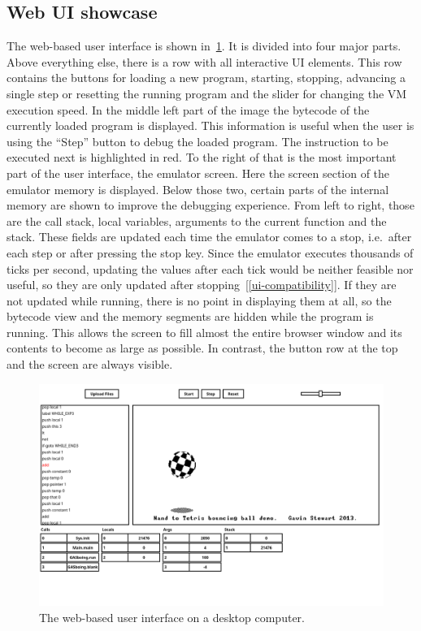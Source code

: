 \subsection{Web UI showcase} \label{ui-showcase}
The web-based user interface is shown in~\cref{fig:ui-demo-desktop}.
It is divided into four major parts.
Above everything else, there is a row with all interactive UI elements.
This row contains the buttons for loading a new program, starting, stopping, advancing a single step or resetting the running program and the slider for changing the VM execution speed.
In the middle left part of the image the bytecode of the currently loaded program is displayed.
This information is useful when the user is using the ``Step'' button to debug the loaded program.
The instruction to be executed next is highlighted in red.
To the right of that is the most important part of the user interface, the emulator screen.
Here the screen section of the emulator memory is displayed.
Below those two, certain parts of the internal memory are shown to improve the debugging experience.
From left to right, those are the call stack, local variables, arguments to the current function and the stack.
These fields are updated each time the emulator comes to a stop, i.e.\ after each step or after pressing the stop key.
Since the emulator executes thousands of ticks per second, updating the values after each tick would be neither feasible nor useful, so they are only updated after stopping~[\ref{ui-compatibility}].
If they are not updated while running, there is no point in displaying them at all, so the bytecode view and the memory segments are hidden while the program is running.
This allows the screen to fill almost the entire browser window and its contents to become as large as possible.
In contrast, the button row at the top and the screen are always visible.
\begin{center}
  \begin{figure}[ht]
    \centering
    \includegraphics[width=14cm]{fig/ui-demo-desktop.png}
    \caption{The web-based user interface on a desktop computer.}%
    \label{fig:ui-demo-desktop}
  \end{figure}
\end{center}
